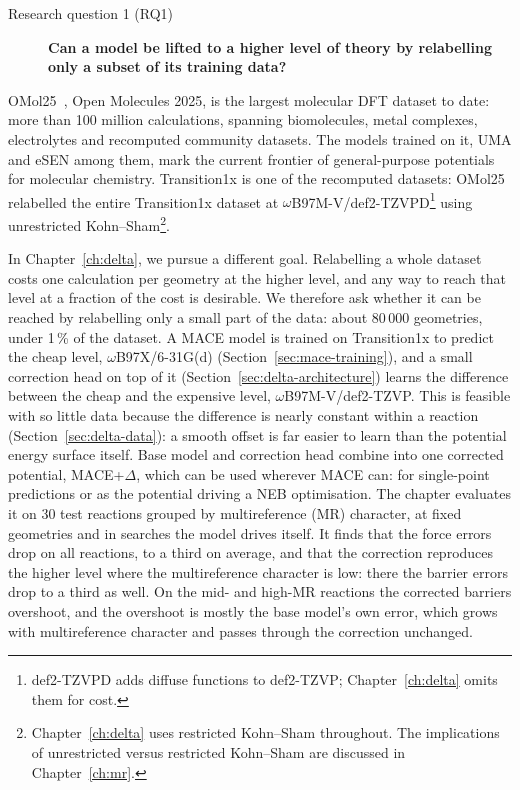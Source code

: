\noindent
\begin{minipage}{\linewidth}
\begin{description}
  \item[Research question 1 (RQ1)] \textbf{Can a model be lifted to a higher
    level of theory by relabelling only a subset of its training data?}
\end{description}
\end{minipage}

OMol25~\cite{omol25}, Open Molecules 2025, is the largest molecular DFT
dataset to date: more than 100 million calculations, spanning
biomolecules, metal complexes, electrolytes and recomputed community
datasets. The models trained on it, UMA and eSEN among them, mark the
current frontier of general-purpose potentials for molecular chemistry.
Transition1x is one of the recomputed datasets: OMol25 relabelled the
entire Transition1x dataset at
\mbox{$\omega$B97M-V/def2-TZVPD}\footnote{def2-TZVPD adds diffuse
functions to def2-TZVP; Chapter~\ref{ch:delta} omits them for cost.} using
unrestricted Kohn--Sham\footnote{Chapter~\ref{ch:delta} uses restricted
Kohn--Sham throughout. The implications of unrestricted versus
restricted Kohn--Sham are discussed in Chapter~\ref{ch:mr}.}.

In Chapter~\ref{ch:delta}, we pursue a different goal. Relabelling a
whole dataset costs one calculation per geometry at the higher level,
and any way to reach that level at a fraction of the cost is
desirable. We therefore ask whether it can be reached by relabelling
only a small part of the data: about 80\,000 geometries, under 1\,\%
of the dataset. A MACE model is trained on Transition1x to predict the cheap level,
\mbox{$\omega$B97X/6-31G(d)} (Section~\ref{sec:mace-training}), and
a small correction head on top of it
(Section~\ref{sec:delta-architecture}) learns the difference between
the cheap and the expensive level, \mbox{$\omega$B97M-V/def2-TZVP}. This is feasible with so little data because
the difference is nearly constant within a reaction
(Section~\ref{sec:delta-data}): a smooth offset is far easier to learn
than the potential energy surface itself. Base model and correction
head combine into one corrected potential, MACE+$\Delta$, which can be
used wherever MACE can: for single-point predictions or as the
potential driving a NEB optimisation. The chapter evaluates it on 30
test reactions grouped by multireference (MR) character, at fixed
geometries and in searches the model drives itself. It finds that the force errors drop on all reactions, to a third on average, and
that the correction reproduces the higher level where the
multireference character is low: there the barrier errors drop to a
third as well. On the mid- and high-MR reactions the corrected
barriers overshoot, and the overshoot is mostly the base model's own
error, which grows with multireference character and passes through
the correction unchanged.

